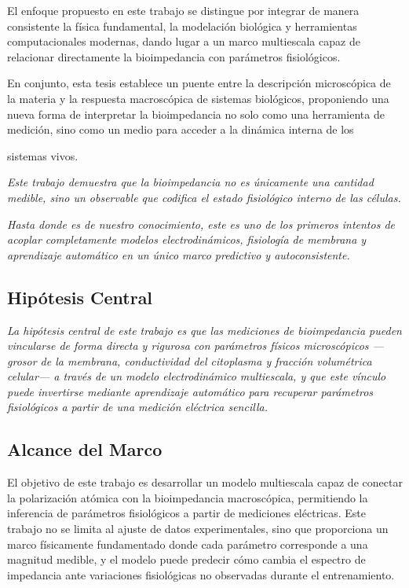 \documentclass[12pt]{article}
\begin{document}
El enfoque propuesto en este trabajo se distingue por integrar de manera
consistente la f\'isica fundamental, la modelaci\'on biol\'ogica y herramientas
computacionales modernas, dando lugar a un marco multiescala capaz de
relacionar directamente la bioimpedancia con par\'ametros fisiol\'ogicos.

En conjunto, esta tesis establece un puente entre la descripci\'on microsc\'opica
de la materia y la respuesta macrosc\'opica de sistemas biol\'ogicos, proponiendo
una nueva forma de interpretar la bioimpedancia no solo como una herramienta
de medici\'on, sino como un medio para acceder a la din\'amica interna de los

sistemas vivos.

\begin{center}
\textit{
Este trabajo demuestra que la bioimpedancia no es \'unicamente una cantidad medible,
sino un observable que codifica el estado fisiol\'ogico interno de las c\'elulas.
}
\end{center}

\begin{center}
\textit{
Hasta donde es de nuestro conocimiento, este es uno de los primeros intentos de
acoplar completamente modelos electrodin\'amicos, fisiolog\'ia de membrana y aprendizaje
autom\'atico en un \'unico marco predictivo y autoconsistente.
}
\end{center}

\subsection*{Hip\'otesis Central}

\emph{La hip\'otesis central de este trabajo es que las mediciones de bioimpedancia
pueden vincularse de forma directa y rigurosa con par\'ametros f\'isicos microsc\'opicos
---grosor de la membrana, conductividad del citoplasma y fracci\'on volum\'etrica
celular--- a trav\'es de un modelo electrodin\'amico multiescala, y que este v\'inculo
puede invertirse mediante aprendizaje autom\'atico para recuperar par\'ametros
fisiol\'ogicos a partir de una medici\'on el\'ectrica sencilla.}

\subsection*{Alcance del Marco}

El objetivo de este trabajo es desarrollar un modelo multiescala capaz de
conectar la polarizaci\'on at\'omica con la bioimpedancia macrosc\'opica, permitiendo
la inferencia de par\'ametros fisiol\'ogicos a partir de mediciones el\'ectricas.
Este trabajo no se limita al ajuste de datos experimentales, sino que proporciona
un marco f\'isicamente fundamentado donde cada par\'ametro corresponde a una magnitud
medible, y el modelo puede predecir c\'omo cambia el espectro de impedancia ante
variaciones fisiol\'ogicas no observadas durante el entrenamiento.
\end{document}
